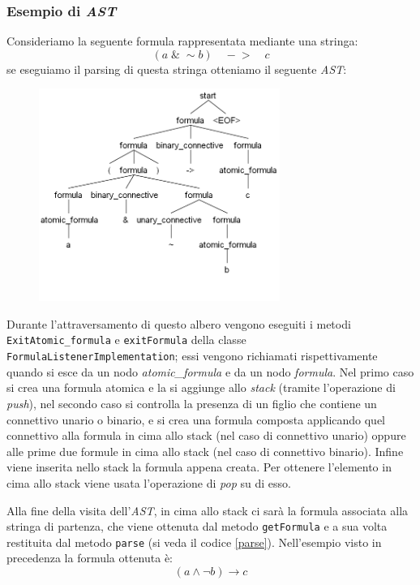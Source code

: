 \documentclass[a4paper,12pt]{report}
\begin{document}
\subsubsection{Esempio di \emph{AST}}
Consideriamo la seguente formula rappresentata mediante una stringa:
\[ (a \; \& \; \sim\!b) \quad -\!> \quad c \]
se eseguiamo il parsing di questa stringa otteniamo il seguente \emph{AST}:
\begin{figure}[H]
    \includegraphics[width=0.7\textwidth, height=0.5\textheight]{img/antlr4_parse_tree.png}
\end{figure}
Durante l'attraversamento di questo albero vengono eseguiti i metodi \\ \texttt{ExitAtomic\_formula} e \texttt{exitFormula} della classe \texttt{FormulaListenerImplementation}; essi vengono richiamati rispettivamente quando si esce da un nodo \emph{atomic\_formula} e da un nodo \emph{formula}. Nel primo caso si crea una formula atomica e la si aggiunge allo \emph{stack} (tramite l'operazione di \emph{push}), nel secondo caso si controlla la presenza di un figlio che contiene un connettivo unario o binario, e si crea una formula composta applicando quel connettivo alla formula in cima allo stack (nel caso di connettivo unario) oppure alle prime due formule in cima allo stack (nel caso di connettivo binario). Infine viene inserita nello stack la formula appena creata. Per ottenere l'elemento in cima allo stack viene usata l'operazione di \emph{pop} su di esso.

Alla fine della visita dell'\emph{AST}, in cima allo stack ci sarà la formula associata alla stringa di partenza, che viene ottenuta dal metodo \texttt{getFormula} e a sua volta restituita dal metodo \texttt{parse} (si veda il codice \ref{parse}). Nell'esempio visto in precedenza la formula ottenuta è:
\[ (a \land \lnot b) \to c \]
\end{document}
